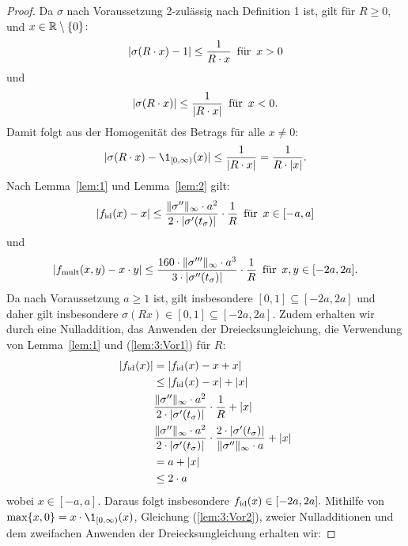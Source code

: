   \begin{proof}
  Da $\sigma$ nach Voraussetzung 2-zulässig nach Definition 1 ist, gilt für $R \geq 0,$ und $x \in \mathbb{R}\setminus\{0\}\colon$ $$|\sigma(R \cdot x) - 1| \leq \frac{1}{R\cdot x} \text{\, für \,} x > 0$$ und $$|\sigma(R \cdot x)| \leq \frac{1}{|R \cdot x|} \text{\, für \,} x < 0.$$
Damit folgt aus der Homogenität des Betrags für alle $x \neq 0$: 
\begin{equation}
\label{lem:3:Bed1} 
|\sigma(R \cdot x) - \1_{[0, \infty)}(x)| \leq \frac{1}{|R \cdot x|} = \frac{1}{R \cdot |x|}.
\end{equation} 
Nach Lemma~\ref{lem:1} und Lemma~\ref{lem:2} gilt:
\begin{equation}
\label{lem:3:Bed2} 
|f_{\mathrm{id}}(x) - x| \leq \frac{\|\sigma''\|_{\infty} \cdot a^2}{2 \cdot |\sigma'(t_{\sigma})|} \cdot \frac{1}{R} \text{\, für \,} x \in [-a, a]
\end{equation}
 und 
\begin{equation}
\label{lem:3:Bed3}
 |f_{\mathrm{mult}}(x, y) - x \cdot y| \leq \frac{160 \cdot \|\sigma'''\|_{\infty} \cdot a ^3}{3 \cdot |\sigma''(t_{\sigma})|} \cdot \frac{1}{R} \text{\, für \,} x, y \in [-2a, 2a].
 \end{equation} 
Da nach Voraussetzung $a \geq 1$ ist, gilt insbesondere $[0, 1] \subseteq [-2a, 2a]$ und daher gilt insbesondere $\sigma(Rx) \in [0, 1]\subseteq [-2a, 2a].$ 
Zudem erhalten wir durch eine Nulladdition, das Anwenden der Dreiecksungleichung, die Verwendung von Lemma~\ref{lem:1} und (\ref{lem:3:Vor1}) für $R$:
\begin{equation*}
\begin{split}
|f_{\mathrm{id}}(x)| & = |f_{\mathrm{id}}(x) - x + x| \\
& \leq |f_{\mathrm{id}}(x) -x| + |x| \\
&  \frac{\|\sigma''\|_{\infty} \cdot a^2}{2 \cdot |\sigma'(t_{\sigma})|} \cdot \frac{1}{R} + |x| \\
& \frac{\|\sigma''\|_{\infty} \cdot a^2}{2 \cdot |\sigma'(t_{\sigma})|} \cdot \frac{2 \cdot |\sigma'(t_{\sigma})|}{\|\sigma''\|_{\infty} \cdot a} + |x| \\
& = a + |x| \\
& \leq 2 \cdot a
\end{split}
\end{equation*}
wobei $x \in [-a, a]$. Daraus folgt insbesondere $f_{\mathrm{id}}(x) \in [-2a, 2a].$
Mithilfe von $\max\{x, 0 \} = x \cdot \1_{[0, \infty)}(x)$, Gleichung (\ref{lem:3:Vor2}), zweier Nulladditionen und dem zweifachen Anwenden der Dreiecksungleichung erhalten wir:

\end{proof}
